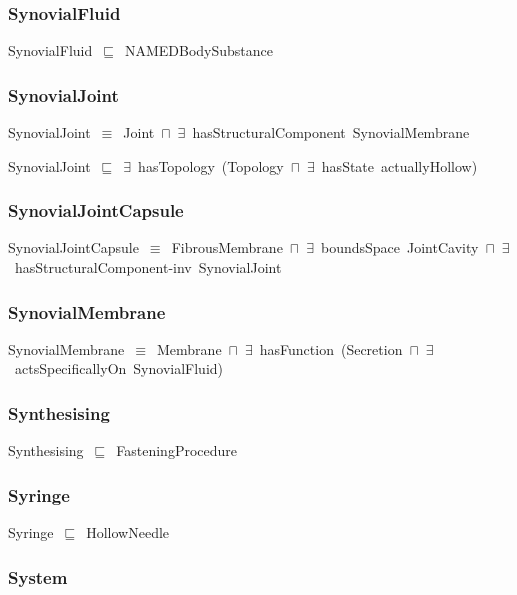 \documentclass{article}
\begin{document}
\subsubsection*{SynovialFluid}

SynovialFluid~\ensuremath{\sqsubseteq}~NAMEDBodySubstance~

\subsubsection*{SynovialJoint}

SynovialJoint~\ensuremath{\equiv}~Joint~\ensuremath{\sqcap}~\ensuremath{\exists}~hasStructuralComponent~SynovialMembrane

SynovialJoint~\ensuremath{\sqsubseteq}~\ensuremath{\exists}~hasTopology~(Topology~\ensuremath{\sqcap}~\ensuremath{\exists}~hasState~actuallyHollow)~

\subsubsection*{SynovialJointCapsule}

SynovialJointCapsule~\ensuremath{\equiv}~FibrousMembrane~\ensuremath{\sqcap}~\ensuremath{\exists}~boundsSpace~JointCavity~\ensuremath{\sqcap}~\ensuremath{\exists}~hasStructuralComponent-inv~SynovialJoint

\subsubsection*{SynovialMembrane}

SynovialMembrane~\ensuremath{\equiv}~Membrane~\ensuremath{\sqcap}~\ensuremath{\exists}~hasFunction~(Secretion~\ensuremath{\sqcap}~\ensuremath{\exists}~actsSpecificallyOn~SynovialFluid)

\subsubsection*{Synthesising}

Synthesising~\ensuremath{\sqsubseteq}~FasteningProcedure~

\subsubsection*{Syringe}

Syringe~\ensuremath{\sqsubseteq}~HollowNeedle~

\subsubsection*{System}
\end{document}
